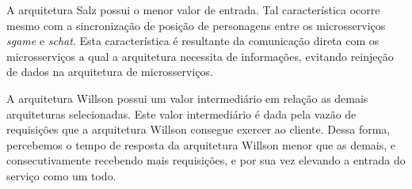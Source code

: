 A arquitetura Salz possui o menor valor de entrada.
%
Tal característica ocorre mesmo com a sincronização de posição de personagens entre os microsserviços \textit{sgame} e \textit{schat}.
%
Esta característica é resultante da comunicação direta com os microsserviços a qual a arquitetura necessita de informações, evitando reinjeção de dados na arquitetura de microsserviços.

A arquitetura Willson possui um valor intermediário em relação as demais arquiteturas selecionadas.
%
Este valor intermediário é dada pela vazão de requisições que a arquitetura Willson consegue exercer ao cliente.
%
Dessa forma, percebemos o tempo de resposta da arquitetura Willson menor que as demais, e consecutivamente recebendo mais requisições, e por sua vez elevando a entrada do serviço como um todo.
